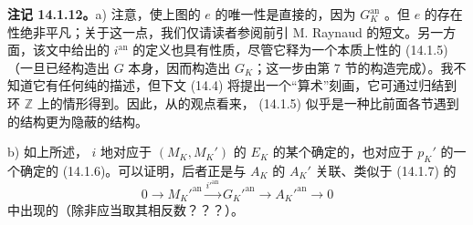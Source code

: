 \textbf{注记 14.1.12。}a) 注意，使上图的 $e$ 的唯一性是直接的，因为 $G_K^{\mathrm{an}}$ 。但 $e$ 的存在性绝非平凡；关于这一点，我们仅请读者参阅前引 M. Raynaud 的短文。另一方面，该文中给出的 $i^{\mathrm{an}}$ 的定义也具有性质，尽管它释为一个本质上性的 (14.1.5)（一旦已经构造出 $G$ 本身，因而构造出 $G_K$；这一步由第 7 节的构造完成）。我不知道它有任何纯的描述，但下文 (14.4) 将提出一个“算术”刻画，它可通过归结到环 $\mathbb Z$ 上的情形得到。因此，从的观点看来， (14.1.5) 似乎是一种比前面各节遇到的结构更为隐蔽的结构。

b) 如上所述， $i$ 地对应于 $(M_K,M_K')$ 的 $E_K$ 的某个确定的，也对应于 $p_K'$ 的一个确定的 (14.1.6)。可以证明，后者正是与 $A_K$ 的 $A_K'$ 关联、类似于 (14.1.7) 的
\begin{equation}\tag{14.1.13}
0\longrightarrow M_K'^{\mathrm{an}}\xrightarrow{i'^{\mathrm{an}}}
G_K'^{\mathrm{an}}\longrightarrow A_K'^{\mathrm{an}}\longrightarrow0
\end{equation}
中出现的（除非应当取其相反数？？？）。

